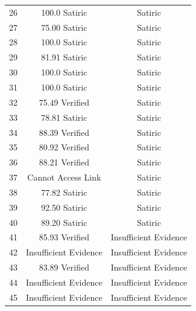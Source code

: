 \documentclass[journal]{./IEEEtran}
\begin{document}
\begin{table}[h!]
\begin{center}
\begin{tabular}{ | c | c | c |}
    			26 & 100.0 Satiric & Satiric\\
    			27 & 75.00 Satiric & Satiric\\
    			28 & 100.0 Satiric & Satiric\\
    			29 & 81.91 Satiric & Satiric\\
    			30 & 100.0 Satiric & Satiric\\
    			31 & 100.0 Satiric & Satiric\\
    			32 & 75.49 Verified & Satiric\\
    			33 & 78.81 Satiric & Satiric\\
    			34 & 88.39 Verified & Satiric\\
    			35 & 80.92 Verified & Satiric\\
    			36 & 88.21 Verified & Satiric\\
    			37 & Cannot Access Link & Satiric\\
    			38 & 77.82 Satiric & Satiric\\
    			39 & 92.50 Satiric & Satiric\\
    			40 & 89.20 Satiric & Satiric\\
    			41 & 85.93 Verified & Insufficient Evidence\\
    			42 & Insufficient Evidence & Insufficient Evidence\\
    			43 & 83.89 Verified & Insufficient Evidence \\
    			44 & Insufficient Evidence & Insufficient Evidence \\
    			45 & Insufficient Evidence & Insufficient Evidence \\
    			\hline
    		\end{tabular}
    		\label{tablec}
    	\end{center}
	\end{table}
\end{document}
